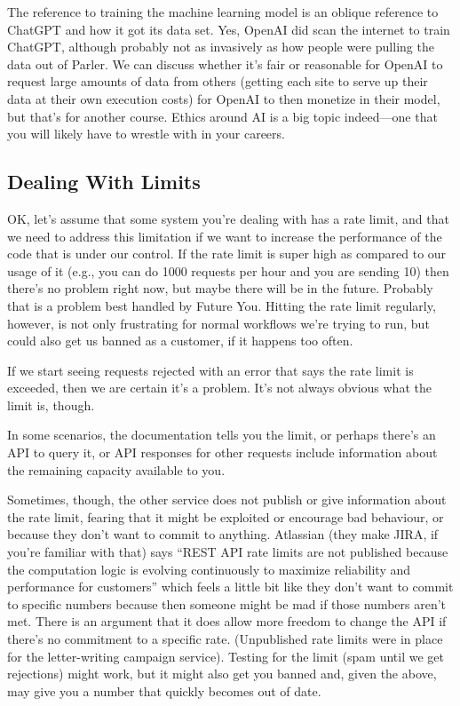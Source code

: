 The reference to training the machine learning model is an oblique reference to ChatGPT and how it got its data set. Yes, OpenAI did scan the internet to train ChatGPT, although probably not as invasively as how people were pulling the data out of Parler. We can discuss whether it's fair or reasonable for OpenAI to request large amounts of data from others (getting each site to serve up their data at their own execution costs) for OpenAI to then monetize in their model, but that's for another course. Ethics around AI is a big topic indeed---one that you will likely have to wrestle with in your careers.


\subsection*{Dealing With Limits}

OK, let's assume that some system you're dealing with has a rate limit, and that we need to address this limitation if we want to increase the performance of the code that is under our control. If the rate limit is super high as compared to our usage of it (e.g., you can do 1000 requests per hour and you are sending 10) then there's no problem right now, but maybe there will be in the future. Probably that is a problem best handled by Future You. Hitting the rate limit regularly, however, is not only frustrating for normal workflows we're trying to run, but could also get us banned as a customer, if it happens too often. 

If we start seeing requests rejected with an error that says the rate limit is exceeded, then we are certain it's a problem. It's not always obvious what the limit is, though.

In some scenarios, the documentation tells you the limit, or perhaps there's an API to query it, or API responses for other requests include information about the remaining capacity available to you. 

Sometimes, though, the other service does not publish or give information about the rate limit, fearing that it might be exploited or encourage bad behaviour, or because they don't want to commit to anything. Atlassian (they make JIRA, if you're familiar with that) says ``REST API rate limits are not published because the computation logic is evolving continuously to maximize reliability and performance for customers'' which feels a little bit like they don't want to commit to specific numbers because then someone might be mad if those numbers aren't met. There is an argument that it does allow more freedom to change the API if there's no commitment to a specific rate. (Unpublished rate limits were in place for the letter-writing campaign service). Testing for the limit (spam until we get rejections) might work, but it might also get you banned and, given the above, may give you a number that quickly becomes out of date.


